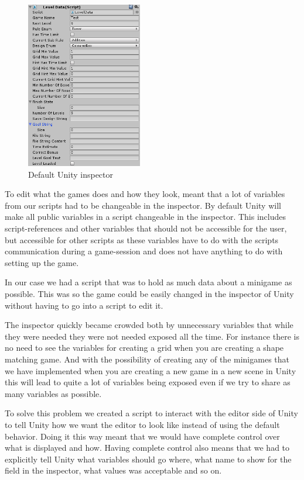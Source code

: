\begin{figure}
	\capstart
	\includegraphics[width=0.45\textwidth]{images/inspector.png}
	\caption{Default Unity inspector}
\end{figure}

To edit what the games does and how they look, meant that a lot of variables from our scripts had to be changeable in the inspector.
By default Unity will make all public variables in a script changeable in the inspector.
This includes script-references and other variables that should not be accessible for the user, but accessible for other scripts as these variables have to do with the scripts communication during a game-session and does not have anything to do with setting up the game.

In our case we had a script that was to hold as much data about a minigame as possible.
This was so the game could be easily changed in the inspector of Unity without having to go into a script to edit it.

The inspector quickly became crowded both by unnecessary variables that while they were needed they were not needed exposed all the time.
For instance there is no need to see the variables for creating a grid when you are creating a shape matching game.
And with the possibility of creating any of the minigames that we have implemented when you are creating a new game in a new scene in Unity 
this will lead to quite a lot of variables being exposed even if we try to share as many variables as possible.

To solve this problem we created a script to interact with the editor side of Unity to tell Unity how we
want the editor to look like instead of using the default behavior.
Doing it this way meant that we would have complete control over what is displayed and how.
Having complete control also means that we had to explicitly tell Unity what variables should go where, what name to show
for the field in the inspector, what values was acceptable and so on. 

